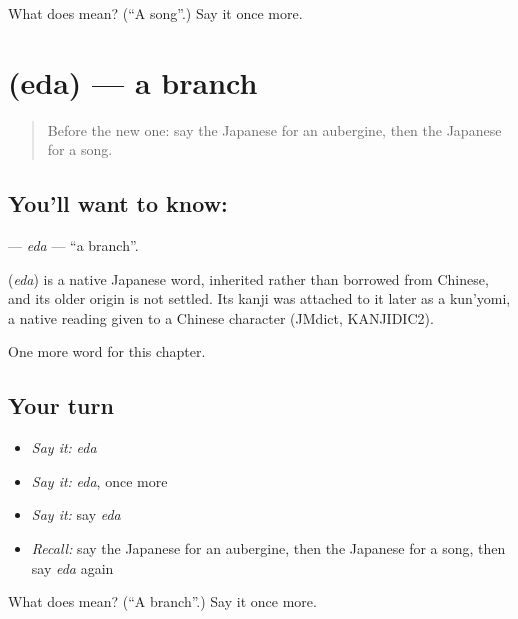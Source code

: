 \begin{tcolorbox}[breakable,colback=teal!4,colframe=teal!35!black,title={Before you move on}]
What does  mean? (\textquotedblleft{}A song\textquotedblright{}.) Say it once more.
\end{tcolorbox}
\section[\texorpdfstring{\ja{えだ} (eda)}{えだ (eda)}]{ (eda) — a branch}

\label{lesson:JA-C60-eda}



\begin{quote}
Before the new one: say the Japanese for an aubergine, then the Japanese for a song.
\end{quote}

\subsection*{You'll want to know: }
\textbf{} — \emph{eda} — \textquotedblleft{}a branch\textquotedblright{}.

\begin{cousinweb}
\textbf{} (\emph{eda}) is a native Japanese word, inherited rather than borrowed from Chinese, and its older origin is not settled. Its kanji was attached to it later as a kun'yomi, a native reading given to a Chinese character (JMdict, KANJIDIC2).
\end{cousinweb}

\begin{grammarlens}[title={What you've built}]
One more word for this chapter.
\end{grammarlens}

\subsection*{Your turn}
\begin{itemize}
\raggedright
  \item \emph{Say it:} \emph{eda}
  \item \emph{Say it:} \emph{eda}, once more
  \item \emph{Say it:} say \emph{eda}
  \item \emph{Recall:} say the Japanese for an aubergine, then the Japanese for a song, then say \emph{eda} again
\end{itemize}

\begin{tcolorbox}[breakable,colback=teal!4,colframe=teal!35!black,title={Before you move on}]
What does  mean? (\textquotedblleft{}A branch\textquotedblright{}.) Say it once more.
\end{tcolorbox}
